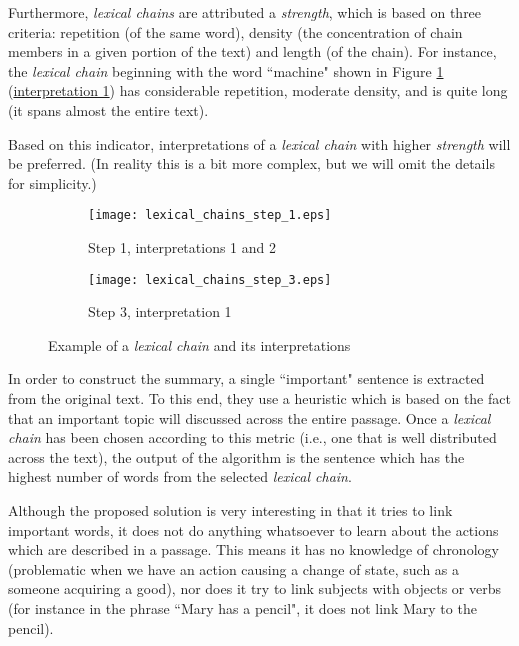 \noindent
Furthermore, \textit{lexical chains} are attributed a \textit{strength}, which is based on three criteria: repetition (of the same word), density (the concentration of chain members in a given portion of the text) and length (of the chain). For instance, the \textit{lexical chain} beginning with the word ``machine" shown in Figure \ref{fig:lexical_chain_example} (\underline{interpretation 1}) has considerable repetition, moderate density, and is quite long (it spans almost the entire text).

Based on this indicator, interpretations of a \textit{lexical chain} with higher \textit{strength} will be preferred. (In reality this is a bit more complex, but we will omit the details for simplicity.)

\begin{figure}[H]
\centering
\begin{subfigure}{0.45\textwidth}
\texttt{[image: lexical\_chains\_step\_1.eps]}
\caption{Step 1, interpretations 1 and 2}
\end{subfigure}
\begin{subfigure}{0.35\textwidth}
\texttt{[image: lexical\_chains\_step\_3.eps]}
\caption{Step 3, interpretation 1}
\end{subfigure}
\caption{\cite{barzilay_using_1997} Example of a \textit{lexical chain} and its interpretations}
\label{fig:lexical_chain_example}
\end{figure}

\noindent
In order to construct the summary, a single ``important" sentence is extracted from the original text. To this end, they use a heuristic which is based on the fact that an important topic will discussed across the entire passage. Once a \textit{lexical chain} has been chosen according to this metric (i.e., one that is well distributed across the text), the output of the algorithm is the sentence which has the highest number of words from the selected \textit{lexical chain}.

\mbox{}

Although the proposed solution is very interesting in that it tries to link important words, it does not do anything whatsoever to learn about the actions which are described in a passage. This means it has no knowledge of chronology (problematic when we have an action causing a change of state, such as a someone acquiring a good), nor does it try to link subjects with objects or verbs (for instance in the phrase ``Mary has a pencil", it does not link Mary to the pencil).

